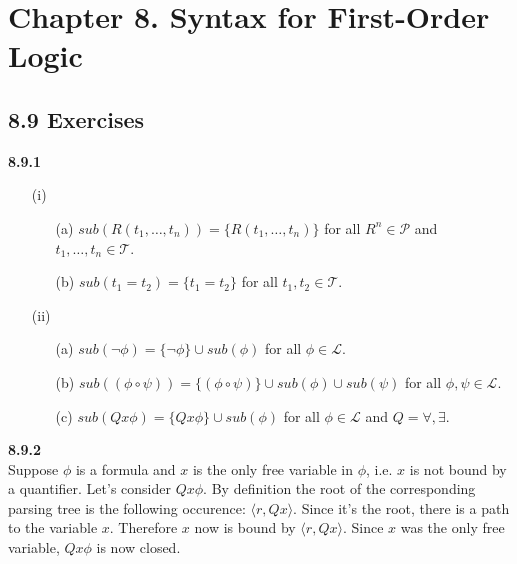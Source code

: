 
\chapter{Chapter 8. Syntax for First-Order Logic}

\section*{8.9 Exercises}

	
\noindent \textbf{8.9.1}
\begin{enumerate}
    \item[(i)] \begin{enumerate}
        \item[(a)] 
	$sub(R(t_1, \dots, t_n)) = \{R(t_1, \dots, t_n)\}$ for all $R^n \in \mathcal{P}$ and \\ $t_1, \dots, t_n \in \mathcal{T}$.
        \item[(b)]
	$sub(t_1 = t_2) = \{t_1 = t_2\}$ for all $t_1, t_2 \in \mathcal{T}$.
	\end{enumerate}
	\item[(ii)] \begin{enumerate}
	    \item[(a)]
	$sub(\neg \phi) = \{\neg \phi\} \cup sub(\phi)$ for all $\phi \in \mathcal L$.
        \item[(b)]
	$sub((\phi \circ \psi)) = \{(\phi \circ \psi)\} \cup sub(\phi) \cup sub(\psi)$ for all $\phi, \psi \in \mathcal L$.
	    \item[(c)]
	$sub(Qx \phi) = \{Qx\phi\} \cup sub(\phi)$ for all $\phi \in \mathcal L$ and $Q = \forall, \exists$.\\
	\end{enumerate}
\end{enumerate}

\noindent \textbf{8.9.2} \\ 
Suppose $\phi$ is a formula and $x$ is the only free variable in $\phi$, i.e. $x$ is not bound by a quantifier. Let's consider $Qx\phi$. By definition the root of the corresponding parsing tree is the following occurence: $\langle r, Qx \rangle$. Since it's the root, there is a path to the variable $x$. Therefore $x$ now is bound by $\langle r, Qx \rangle$. Since $x$ was the only free variable, $Qx\phi$ is now closed.\\

